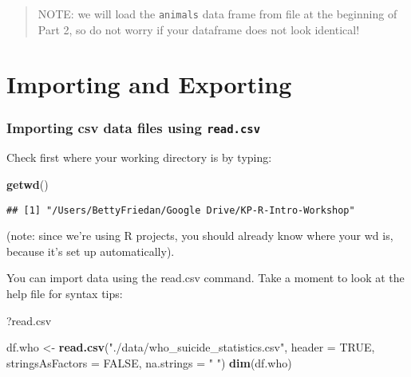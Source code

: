 \documentclass[]{article}
\newenvironment{Shaded}{\begin{snugshade}}{\end{snugshade}}
\newcommand{\KeywordTok}[1]{\textcolor[rgb]{0.13,0.29,0.53}{\textbf{#1}}}
\newcommand{\DataTypeTok}[1]{\textcolor[rgb]{0.13,0.29,0.53}{#1}}
\newcommand{\StringTok}[1]{\textcolor[rgb]{0.31,0.60,0.02}{#1}}
\newcommand{\OtherTok}[1]{\textcolor[rgb]{0.56,0.35,0.01}{#1}}
\newcommand{\NormalTok}[1]{#1}
\begin{document}
\begin{quote}
NOTE: we will load the \texttt{animals} data frame from file at the
beginning of Part 2, so do not worry if your dataframe does not look
identical!
\end{quote}

\section{Importing and Exporting}\label{importing-and-exporting}

\subsubsection{\texorpdfstring{Importing csv data files using
\texttt{read.csv}}{Importing csv data files using read.csv}}\label{importing-csv-data-files-using-read.csv}

Check first where your working directory is by typing:

\begin{Shaded}
\begin{Highlighting}[]
\KeywordTok{getwd}\NormalTok{()}
\end{Highlighting}
\end{Shaded}

\begin{verbatim}
## [1] "/Users/BettyFriedan/Google Drive/KP-R-Intro-Workshop"
\end{verbatim}

(note: since we're using R projects, you should already know where your
wd is, because it's set up automatically).

You can import data using the read.csv command. Take a moment to look at
the help file for syntax tips:

\begin{Shaded}
\begin{Highlighting}[]
\NormalTok{?read.csv}
\end{Highlighting}
\end{Shaded}

\begin{Shaded}
\begin{Highlighting}[]
\NormalTok{df.who <-}\StringTok{ }\KeywordTok{read.csv}\NormalTok{(}\StringTok{"./data/who_suicide_statistics.csv"}\NormalTok{, }
                    \DataTypeTok{header =} \OtherTok{TRUE}\NormalTok{, }
                    \DataTypeTok{stringsAsFactors =} \OtherTok{FALSE}\NormalTok{,}
                    \DataTypeTok{na.strings =} \StringTok{" "}\NormalTok{)}
\KeywordTok{dim}\NormalTok{(df.who)}
\end{Highlighting}
\end{Shaded}
\end{document}
